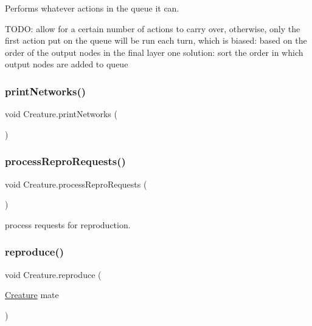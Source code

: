 Performs whatever actions in the queue it can. 

T\+O\+DO\+: allow for a certain number of actions to carry over, otherwise, only the first action put on the queue will be run each turn, which is biased\+: based on the order of the output nodes in the final layer one solution\+: sort the order in which output nodes are added to queue\mbox{\label{class_creature_a46fa0cc06932a4cdba0e7b1f8f2dad9c}} 
\subsubsection{\texorpdfstring{print\+Networks()}{printNetworks()}}
{\footnotesize\ttfamily void Creature.\+print\+Networks (\begin{DoxyParamCaption}{ }\end{DoxyParamCaption})}

\mbox{\label{class_creature_a13b61e24bb6dfa9cd53e7919378c4b0c}} 
\subsubsection{\texorpdfstring{process\+Repro\+Requests()}{processReproRequests()}}
{\footnotesize\ttfamily void Creature.\+process\+Repro\+Requests (\begin{DoxyParamCaption}{ }\end{DoxyParamCaption})}



process requests for reproduction. 

\mbox{\label{class_creature_abd5e8fd01b4197fdb549fd38da914f2a}} 
\subsubsection{\texorpdfstring{reproduce()}{reproduce()}}
{\footnotesize\ttfamily void Creature.\+reproduce (\begin{DoxyParamCaption}\item[{\mbox{\hyperlink{class_creature}{Creature}}}]{mate }\end{DoxyParamCaption})}



